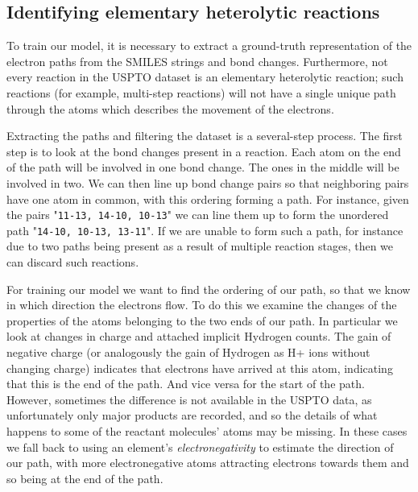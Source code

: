 \subsection{Identifying elementary heterolytic reactions}

To train our model, it is necessary to extract a ground-truth representation of the electron paths from the SMILES strings and bond changes.
Furthermore, not every reaction in the USPTO dataset is an elementary heterolytic reaction; 
such reactions (for example, multi-step reactions) will not have a single unique path through the atoms 
which describes the movement of the electrons.

Extracting the paths and filtering the dataset is a several-step process.
The first step is to look at the bond changes present in a reaction. 
Each atom on the end of the path will be involved in one bond change. 
The ones in the middle will be involved in two. 
We can then line up bond change pairs so that neighboring pairs have one atom in common,
 with this ordering forming a path.
For instance, given the pairs "\texttt{11-13, 14-10, 10-13}" we can line them up to form the unordered path "\texttt{14-10, 10-13, 13-11}".
If we are unable to form such a path, for instance due to two paths being present as a result of multiple reaction stages, then we can discard such reactions.

For training our model we want to find the ordering of our path, so that we know in which direction the electrons flow.
To do this we examine the changes of the properties of the atoms belonging to the two ends of our path. 
In particular we look at changes in charge and attached implicit Hydrogen counts. 
The gain of negative charge (or analogously the gain of Hydrogen as H+ ions without changing charge) indicates that electrons have arrived at this atom, 
indicating that this is the end of the path. 
And vice versa for the start of the path.
However, sometimes the difference is not available in the USPTO data, as unfortunately only major products are recorded, and so the details of what happens to some of the reactant molecules' atoms may be missing.
In these cases we fall back to using an element's {\em electronegativity} to estimate the direction of our path, with more electronegative atoms attracting electrons towards them and so being at the end of the path. 

